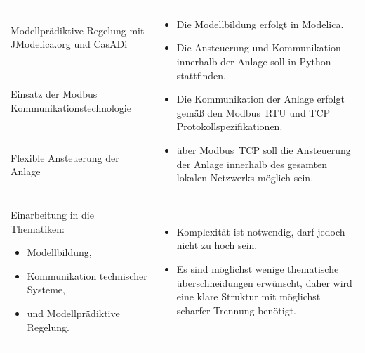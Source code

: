 \begin{table}[H]
\begin{tabularx}{1\textwidth}{m{}m{}}
\addlinespace[4mm] Modellprädiktive Regelung mit JModelica.org und CasADi \newline & \multirow{3}{\hsize}{
\begin{minipage}[t]{0.57\textwidth}
\begin{itemize}[itemsep=0pt,topsep=0pt,leftmargin=5mm]
\item Die Modellbildung erfolgt in Modelica.
\item Die Ansteuerung und Kommunikation innerhalb der Anlage soll in Python stattfinden.
\item Die Kommunikation der Anlage erfolgt gemäß den Modbus~RTU und TCP Protokollspezifikationen.
\item über Modbus~TCP soll die Ansteuerung der Anlage innerhalb des gesamten lokalen Netzwerks möglich sein.
\end{itemize}
\end{minipage}
}  \\

\cmidrule[0.1pt](lr{2em}){1-1}
\addlinespace[4mm] Einsatz der Modbus \newline Kommunikationstechnologie \newline 	& 		\\

\cmidrule[0.1pt](lr{2em}){1-1}
\addlinespace[4mm] Flexible Ansteuerung der Anlage \newline & \\

\cmidrule[0.5pt](r{0.25em}){1-1} 
\cmidrule[0.5pt](l{0.25em}){2-2}

Einarbeitung in die Thematiken:
\begin{minipage}[t]{0.34\textwidth}
\begin{itemize}[itemsep=0pt,topsep=0pt,leftmargin=4mm]
	\item Modellbildung,
	\item Kommunikation technischer \newline Systeme,
	\item und Modellprädiktive \newline Regelung.
\end{itemize}
\end{minipage}
 	& \multirow{2}{\hsize}{
\begin{minipage}[t]{0.57\textwidth}
\begin{itemize}[itemsep=0pt,topsep=0pt,leftmargin=5mm]
	\item Komplexität ist notwendig, darf jedoch nicht zu hoch sein.
	\item Es sind möglichst wenige thematische überschneidungen erwünscht, daher wird eine klare Struktur mit möglichst scharfer Trennung benötigt.
\end{itemize}
\end{minipage}
}  \\


\end{tabularx}
\end{table}
